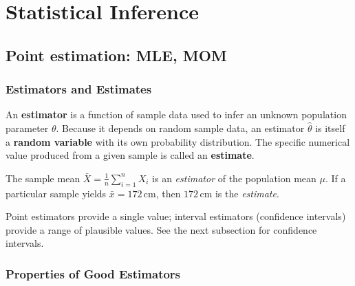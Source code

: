 
\section{Statistical Inference}

\subsection{Point estimation: MLE, MOM}

\subsubsection*{Estimators and Estimates}

\begin{definition}
An \textbf{estimator} is a function of sample data used to infer an unknown population parameter $\theta$. Because it depends on random sample data, an estimator $\hat{\theta}$ is itself a \textbf{random variable} with its own probability distribution. The specific numerical value produced from a given sample is called an \textbf{estimate}.
\end{definition}

\begin{example}
The sample mean $\bar{X} = \frac{1}{n}\sum_{i=1}^n X_i$ is an \emph{estimator} of the population mean $\mu$. If a particular sample yields $\bar{x} = 172\,\text{cm}$, then $172\,\text{cm}$ is the \emph{estimate}.
\end{example}

\begin{remark}
Point estimators provide a single value; interval estimators (confidence intervals) provide a range of plausible values. See the next subsection for confidence intervals.
\end{remark}

\subsubsection*{Properties of Good Estimators}

